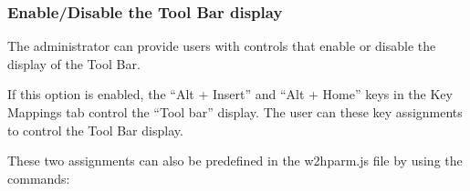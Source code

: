 \documentclass[letterpaper,10pt,english]{sphinxmanual}
\begin{document}
\subsubsection{Enable/Disable the Tool Bar display}
\label{\detokenize{Customization:enable-disable-the-tool-bar-display}}\label{\detokenize{Customization:index-18}}
\sphinxAtStartPar
The administrator can provide users with controls that enable or disable the display of the Tool Bar.

\begin{sphinxVerbatim}[commandchars=\\\{\}]
             
  
\end{sphinxVerbatim}

\sphinxAtStartPar
{}

\sphinxAtStartPar
If this option is enabled, the “Alt + Insert” and “Alt + Home” keys in the Key Mappings tab control the “Tool bar” display. The user can these key assignments to control the Tool Bar display.

\sphinxAtStartPar
{}

\sphinxAtStartPar
{}

\ignorespaces 
\sphinxAtStartPar
These two assignments can also be predefined in the w2hparm.js file by using the commands:

\begin{sphinxVerbatim}[commandchars=\\\{\}]
           
 
\end{sphinxVerbatim}
\end{document}

